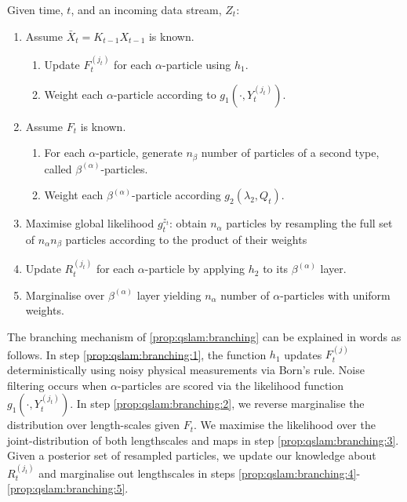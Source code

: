 \begin{proposition} \label{prop:qslam:branching}
	
	Given time, $t$, and an incoming data stream, $Z_t$:
	\begin{enumerate}
	\item Assume $\bar{X}_{t} = K_{t-1}X_{t-1}$ is known. \label{prop:qslam:branching:1}
		\begin{enumerate}
			 \item Update $F_t^{(j_t)}$ for each $\alpha$-particle using $h_1$. 
			 \item Weight each $\alpha$-particle according to $ g_1(\cdot, Y_t^{(j_t)})$.
		\end{enumerate}
	\item Assume $F_t$ is known. \label{prop:qslam:branching:2}
		\begin{enumerate}
			\item For each $\alpha$-particle, generate $n_\beta$ number of particles of a second type,  called $\beta^{(\alpha)}$-particles.
			\item Weight each $\beta^{(\alpha)}$-particle according $g_2(\lambda_2, Q_t)$.
	\end{enumerate}
	\item Maximise global likelihood $ g_t^{z_t}$:  obtain $n_\alpha$ particles by resampling the full set of $n_\alpha n_\beta$ particles according to the product of their weights \label{prop:qslam:branching:3}
	\item Update $R_t^{(j_t)}$ for each $\alpha$-particle by applying $h_2$ to its $\beta^{(\alpha)}$ layer. \label{prop:qslam:branching:4}
	\item Marginalise over $\beta^{(\alpha)}$ layer yielding $n_\alpha$ number of $\alpha$-particles with uniform weights.  \label{prop:qslam:branching:5}
	\end{enumerate} 
\end{proposition}
The branching mechanism of \cref{prop:qslam:branching} can be explained in words as follows. In step \ref{prop:qslam:branching:1}, the function $h_1$ updates $F_t^{(j)}$ deterministically using noisy physical measurements via Born's rule. Noise filtering occurs when $\alpha$-particles are scored via the likelihood function $g_1(\cdot, Y_t^{(j_t)})$.  In step \ref{prop:qslam:branching:2}, we reverse marginalise the distribution over length-scales given $F_t$. We maximise the likelihood over the joint-distribution of both lengthscales and maps in step \ref{prop:qslam:branching:3}. Given a posterior set of resampled particles, we update our knowledge about $R_t^{(j_t)}$ and marginalise out lengthscales in steps \ref{prop:qslam:branching:4}-\ref{prop:qslam:branching:5}. \\
